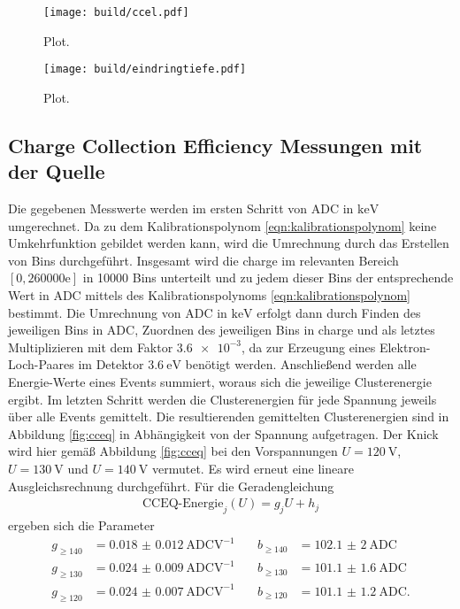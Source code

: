 \begin{figure}
  \centering
  \texttt{[image: build/ccel.pdf]}
  \caption{Plot.}
  \label{fig:ccel}
\end{figure}

\begin{figure}
  \centering
  \texttt{[image: build/eindringtiefe.pdf]}
  \caption{Plot.}
  \label{fig:eindringtiefe}
\end{figure}

\subsection{Charge Collection Efficiency Messungen mit der Quelle}

Die gegebenen Messwerte werden im ersten Schritt von ADC in $\si{\kilo\electronvolt}$ umgerechnet.
Da zu dem Kalibrationspolynom \eqref{eqn:kalibrationspolynom} keine Umkehrfunktion gebildet werden kann,
wird die Umrechnung durch das Erstellen von Bins durchgeführt. Insgesamt wird die charge im relevanten Bereich
$[0,260000\mathrm{e}]$ in 10000 Bins unterteilt und zu jedem dieser Bins der entsprechende Wert in ADC mittels
des Kalibrationspolynoms \eqref{eqn:kalibrationspolynom} bestimmt. Die Umrechnung von ADC in $\si{\kilo\electronvolt}$
erfolgt dann durch Finden des jeweiligen Bins in ADC, Zuordnen des jeweiligen Bins in charge und als letztes Multiplizieren
mit dem Faktor $\num{3.6e-3}$, da zur Erzeugung eines Elektron-Loch-Paares im Detektor $\SI{3.6}{\electronvolt}$
benötigt werden. Anschließend werden alle Energie-Werte eines Events summiert, woraus sich die jeweilige Clusterenergie ergibt.
Im letzten Schritt werden die Clusterenergien für jede Spannung jeweils über alle Events gemittelt. Die resultierenden
gemittelten Clusterenergien sind in Abbildung \ref{fig:cceq} in Abhängigkeit von der Spannung aufgetragen.
Der Knick wird hier gemäß Abbildung \ref{fig:cceq} bei den Vorspannungen $U = \SI{120}{\volt}$, $U = \SI{130}{\volt}$ und
$U = \SI{140}{\volt}$ vermutet. Es wird erneut eine lineare Ausgleichsrechnung durchgeführt.
Für die Geradengleichung
\begin{align}
  \text{CCEQ-Energie}_j(U) = g_j U + h_j
\end{align}
ergeben sich die Parameter
\begin{align*}
  g_{\geq140} &= \SI{0.018(12)}{\text{ADC}\volt\tothe{-1}} &\quad b_{\geq140} &= \SI{102.1(20)}{\text{ADC}} \\
  g_{\geq130} &=  \SI{0.024(9)}{\text{ADC}\volt\tothe{-1}} &\quad b_{\geq130} &= \SI{101.1(16)}{\text{ADC}} \\
  g_{\geq120} &=  \SI{0.024(7)}{\text{ADC}\volt\tothe{-1}} &\quad b_{\geq120} &= \SI{101.1(12)}{\text{ADC}}.
\end{align*}
